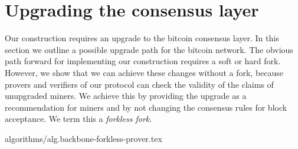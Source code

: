 \section{Upgrading the consensus layer}

Our construction requires an upgrade to the bitcoin consensus layer. In this
section we outline a possible upgrade path for the bitcoin network. The obvious
path forward for implementing our construction requires a soft or hard fork.
However, we show that we can achieve these changes without a fork, because
provers and verifiers of our protocol can check the validity of the claims of
unupgraded miners.  We achieve this by providing the upgrade as a
recommendation for miners and by not changing the consensus rules for block
acceptance. We term this a \textit{forkless fork}.

{algorithms/alg.backbone-forkless-prover.tex}
